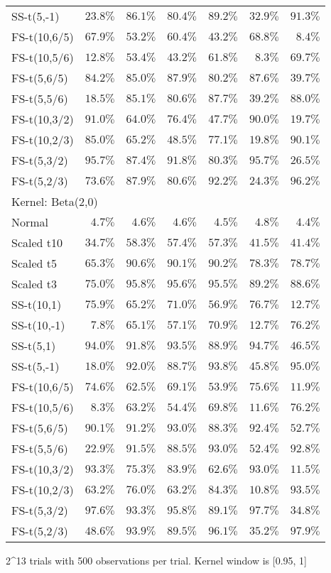 \begin{longtable}{lrrrrrr}
SS-t(5,-1) & $23.8\%$ & $86.1\%$ & $80.4\%$ & $89.2\%$ & $32.9\%$ & $91.3\%$ \\ 
FS-t(10,6/5) & $67.9\%$ & $53.2\%$ & $60.4\%$ & $43.2\%$ & $68.8\%$ & $8.4\%$ \\ 
FS-t(10,5/6) & $12.8\%$ & $53.4\%$ & $43.2\%$ & $61.8\%$ & $8.3\%$ & $69.7\%$ \\ 
FS-t(5,6/5) & $84.2\%$ & $85.0\%$ & $87.9\%$ & $80.2\%$ & $87.6\%$ & $39.7\%$ \\ 
FS-t(5,5/6) & $18.5\%$ & $85.1\%$ & $80.6\%$ & $87.7\%$ & $39.2\%$ & $88.0\%$ \\ 
FS-t(10,3/2) & $91.0\%$ & $64.0\%$ & $76.4\%$ & $47.7\%$ & $90.0\%$ & $19.7\%$ \\ 
FS-t(10,2/3) & $85.0\%$ & $65.2\%$ & $48.5\%$ & $77.1\%$ & $19.8\%$ & $90.1\%$ \\ 
FS-t(5,3/2) & $95.7\%$ & $87.4\%$ & $91.8\%$ & $80.3\%$ & $95.7\%$ & $26.5\%$ \\ 
FS-t(5,2/3) & $73.6\%$ & $87.9\%$ & $80.6\%$ & $92.2\%$ & $24.3\%$ & $96.2\%$ \\ 
\midrule
\multicolumn{7}{l}{Kernel: Beta(2,0)} \\ 
\midrule
Normal & $4.7\%$ & $4.6\%$ & $4.6\%$ & $4.5\%$ & $4.8\%$ & $4.4\%$ \\ 
Scaled t10 & $34.7\%$ & $58.3\%$ & $57.4\%$ & $57.3\%$ & $41.5\%$ & $41.4\%$ \\ 
Scaled t5 & $65.3\%$ & $90.6\%$ & $90.1\%$ & $90.2\%$ & $78.3\%$ & $78.7\%$ \\ 
Scaled t3 & $75.0\%$ & $95.8\%$ & $95.6\%$ & $95.5\%$ & $89.2\%$ & $88.6\%$ \\ 
SS-t(10,1) & $75.9\%$ & $65.2\%$ & $71.0\%$ & $56.9\%$ & $76.7\%$ & $12.7\%$ \\ 
SS-t(10,-1) & $7.8\%$ & $65.1\%$ & $57.1\%$ & $70.9\%$ & $12.7\%$ & $76.2\%$ \\ 
SS-t(5,1) & $94.0\%$ & $91.8\%$ & $93.5\%$ & $88.9\%$ & $94.7\%$ & $46.5\%$ \\ 
SS-t(5,-1) & $18.0\%$ & $92.0\%$ & $88.7\%$ & $93.8\%$ & $45.8\%$ & $95.0\%$ \\ 
FS-t(10,6/5) & $74.6\%$ & $62.5\%$ & $69.1\%$ & $53.9\%$ & $75.6\%$ & $11.9\%$ \\ 
FS-t(10,5/6) & $8.3\%$ & $63.2\%$ & $54.4\%$ & $69.8\%$ & $11.6\%$ & $76.2\%$ \\ 
FS-t(5,6/5) & $90.1\%$ & $91.2\%$ & $93.0\%$ & $88.3\%$ & $92.4\%$ & $52.7\%$ \\ 
FS-t(5,5/6) & $22.9\%$ & $91.5\%$ & $88.5\%$ & $93.0\%$ & $52.4\%$ & $92.8\%$ \\ 
FS-t(10,3/2) & $93.3\%$ & $75.3\%$ & $83.9\%$ & $62.6\%$ & $93.0\%$ & $11.5\%$ \\ 
FS-t(10,2/3) & $63.2\%$ & $76.0\%$ & $63.2\%$ & $84.3\%$ & $10.8\%$ & $93.5\%$ \\ 
FS-t(5,3/2) & $97.6\%$ & $93.3\%$ & $95.8\%$ & $89.1\%$ & $97.7\%$ & $34.8\%$ \\ 
FS-t(5,2/3) & $48.6\%$ & $93.9\%$ & $89.5\%$ & $96.1\%$ & $35.2\%$ & $97.9\%$ \\ 
\bottomrule
\end{longtable}
\begin{minipage}{\linewidth}
2\textasciicircum{}13 trials with 500 observations per trial. Kernel window is [0.95, 1]\\
\end{minipage}

